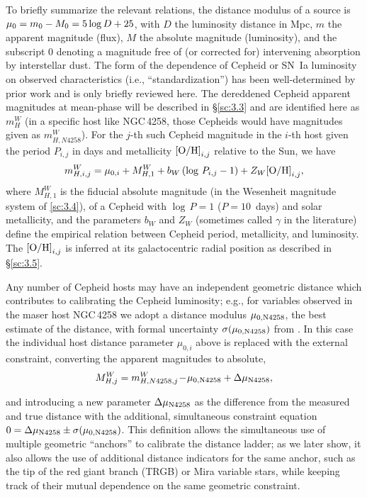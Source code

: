 \documentclass[12pt]{aastex631}
\newcommand{\bq}{\begin{equation}}
\newcommand{\eq}{\end{equation}}
\begin{document}
To briefly summarize the relevant relations, the distance modulus of a source is $\mu_0=m_0-M_0=5\, {\rm log}\,D + 25$, with $D$ the luminosity distance in Mpc, $m$ the apparent magnitude (flux), $M$ the absolute magnitude (luminosity), and the subscript 0 denoting a magnitude free of (or corrected for) intervening absorption by interstellar dust. The form of the dependence of Cepheid or SN~Ia luminosity on observed characteristics (i.e., ``standardization'') has been well-determined by prior work and is only briefly reviewed here.  The dereddened Cepheid apparent magnitudes \citep[also called ``Wesenheit'' magnitudes;][]{madore82} at mean-phase will be described in \S\ref{sc:3.3} and are identified here as $m_H^W$  (in a specific host like NGC$\,$4258, those Cepheids would have magnitudes given as $m^W_{H,N4258}$).  For the $j$-th such Cepheid magnitude in the $i$-th host given the period $P_{i,j}$ in days and metallicity ${\rm [O/H]}_{i,j}$ relative to the Sun, we have
\bq m_{H,i,j}^W=\mu_{0,i}+M_{H,1}^W+b_W\, (\log\,P_{i,j}-1) +Z_W {\rm [O/H]}_{i,j}, \label{eq:cephmagalt} \eq
\noindent where $M_{H,1}^W$ is the fiducial absolute magnitude (in the Wesenheit magnitude system of \ref{sc:3.4}), of a Cepheid with $\log\,P\!=\!1$ ($P\!=\!10$~days) and solar metallicity, and the parameters $b_W$ and $Z_W$ (sometimes called $\gamma$ in the literature) define the empirical relation between Cepheid period, metallicity, and luminosity.  The ${\rm [O/H]}_{i,j}$ is inferred at its galactocentric radial position as described in \S\ref{sc:3.5}.  

Any number of Cepheid hosts may have an independent geometric distance which contributes to calibrating the Cepheid luminosity; e.g., for variables observed in the maser host NGC$\,$4258 we adopt a distance modulus $\mu_{0,\rm N4258}$, the best estimate of the distance,  with formal uncertainty $\sigma(\mu_{0,{\rm N4258}})$ from \citet{Reid:2019}.  In this case the individual host distance parameter $\mu_{0,i}$ above is replaced with the external constraint, converting the apparent magnitudes to absolute,
\bq M_{H,j}^W=m_{H,N4258,j}^W\!-\!\mu_{0,\rm N4258}+\Delta \mu_{\rm N4258},\label{eq:bkg} \eq

\noindent and introducing a new parameter $\Delta \mu_{\rm N4258}$ as the difference from the measured and true distance with the additional, simultaneous constraint equation $0=\Delta \mu_{\rm N4258} \pm \sigma(\mu_{ 0,{\rm N4258}})$.  This definition allows the simultaneous use of multiple geometric ``anchors'' to calibrate the distance ladder; as we later show, it also allows the use of additional distance indicators for the same anchor, such as the tip of the red giant branch (TRGB) or Mira variable stars, while keeping track of their mutual dependence on the same geometric constraint.
\end{document}
